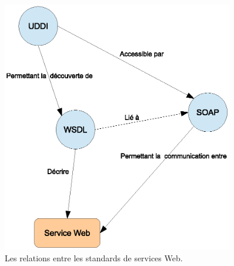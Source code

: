 \begin{figure}[h]
    \centering
    \includegraphics[width=0.9\textwidth]{figs/ws-standards-relationships.eps}
    \caption{Les relations entre les standards de services Web.
      \cite{erl2004service}}
    \label{fig:ws-standards-relationships}
\end{figure}

